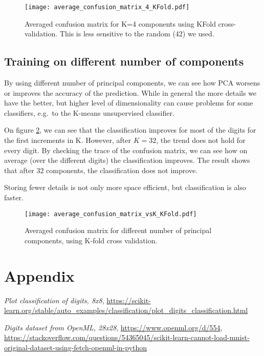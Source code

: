 \documentclass{article}
\begin{document}
\begin{figure}[ht!]
    \centering
    \texttt{[image: average\_confusion\_matrix\_4\_KFold.pdf]}
    \caption{Averaged confusion matrix for K=4 components using KFold cross-validation.
        This is less sensitive to the random (42) we used.}
    \label{fig:confusion_matrix_4_kfold}
\end{figure}

\subsection{Training on different number of components}
By using different number of principal components,
we can see how PCA worsens or improves the accuracy of the prediction.
While in general the more details we have the better,
but higher level of dimensionality can cause problems for some classifiers,
e.g.\ to the K-means unsupervised classifier.

On figure \ref{fig:confusion_matrix_4_kfold_K},
we can see that the classification improves for most of the digits for the first increments in K.
However, after $K=32$, the trend does not hold for every digit.
By checking the trace of the confusion matrix, we can see how on average (over the different digits)
the classification improves.
The result shows that after 32 components, the classification does not improve.

Storing fewer details is not only more space efficient,
but classification is also faster.


\begin{figure}[ht!]
    \centering
    \texttt{[image: average\_confusion\_matrix\_vsK\_KFold.pdf]}
    \caption{Averaged confusion matrix for different number of principal components,
        using K-fold cross validation.}
    \label{fig:confusion_matrix_4_kfold_K}
\end{figure}


\clearpage
\section{Appendix}

\begin{thebibliography}{9}
    \textit{Plot classification of digits, 8x8},
    \url{https://scikit-learn.org/stable/auto_examples/classification/plot_digits_classification.html}

    \textit{Digits dataset from OpenML, 28x28},
    \url{https://www.openml.org/d/554},
    \url{https://stackoverflow.com/questions/54365045/scikit-learn-cannot-load-mnist-original-dataset-using-fetch-openml-in-python}
\end{thebibliography}
\end{document}
